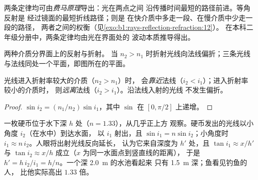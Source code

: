 \begin{remark}[定律的来源]\label{rem:b1:rays-reflection-refraction:fermat}
两条定律均可由\emph{费马原理}导出：光在两点之间
沿传播时间最短的路径前进。等角反射是
经过镜面的最短折线路径；则是
在快介质中多走一段、在慢介质中少走一段的路径，
两者之间的权衡（见\cref{exo:b1:rays-reflection-refraction:12}）。
在本科二年级分册中，两条定律均由光在界面处的
波动本质推导得出。
\end{remark}

\begin{omfigure}

{\small 两种介质分界面上的反射与折射。
当 $n_2 > n_1$ 时折射光线向法线偏折；三条光线
与法线同处一个平面，即图所在的平面。}
\end{omfigure}

\begin{proposition}[光线的弯折方向]\label{prop:b1:rays-reflection-refraction:bending}
光线进入折射率较大的介质（$n_2 > n_1$）时，
会\emph{靠近}法线（$i_2 < i_1$）；进入折射率较小的介质时，
则\emph{远离}法线（$i_2 > i_1$）。沿法线入射的光线
不发生偏折。
\end{proposition}

\begin{proof}
$\sin i_2 = (n_1/n_2)\sin i_1$，其中 $\sin$ 在
$[0, \pi/2]$ 上递增。
\end{proof}

\begin{example}[视深]\label{ex:b1:rays-reflection-refraction:depth}
一枚硬币位于水下深 $h$ 处（$n = 1.33$），从几乎正上方
观察。硬币发出的光线以小角度 $i_2$（在水中）到达水面，
以 $i_1$ 射出，且 $\sin i_1 = n\sin i_2$；小角度时
$i_1 \approx n\,i_2$。人眼将出射光线反向延长，
认为它来自深度为 $h'$ 处，且 $\tan i_1 \approx x/h'$ 与
$\tan i_2 \approx x/h$ 成立（$x$ 为同一水面点到竖直线的距离），
于是 $h' = h\,i_2/i_1 = h/n$。一个深 \qty{2.0}{m} 的水池看起来
只有 \qty{1.5}{m} 深；鱼看见钓鱼的人，
比他实际高出 $1.33$ 倍。
\end{example}

